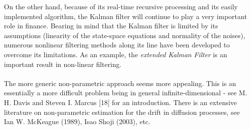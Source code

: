 \documentclass{article}
\theoremstyle{definition}
\theoremstyle{remark}
\begin{document}

On the other hand, because of its real-time recursive processing and its easily implemented algorithm, the Kalman filter will continue to play a very important role in finance. Bearing in mind that the Kalman filter is limited by its assumptions (linearity of the state-space equations and normality of the noises), numerous nonlinear filtering methods along its line have been developed to overcome its limitations. As an example, the \emph{extended Kalman Filter} is an important result in non-linear filtering.\\
\\


The more generic non-parametric approach seems more appealing. This is an essentially a more difficult problem being in general infinite-dimensional - see M. H. Davis and Steven I. Marcus [18] for an introduction. There is an extensive literature on non-parametric estimation for the drift in diffusion processes, see Ian W. McKeague (1989), Isao Shoji (2003), etc.\\
\\









\end{document}
